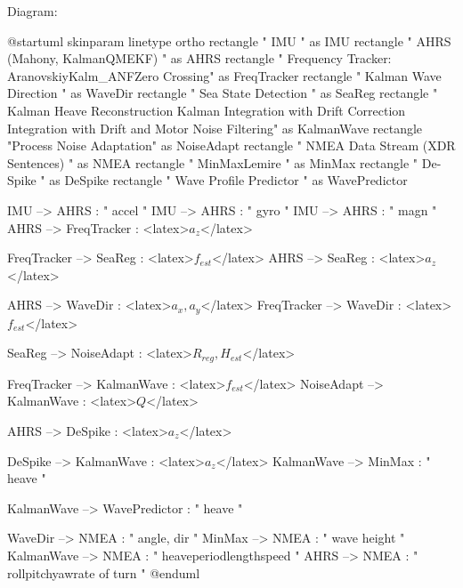 \documentclass{article}
\begin{document}
Diagram:

\begin{plantuml}
@startuml
skinparam linetype ortho
rectangle "                         IMU                          " as IMU
rectangle "                                                                AHRS (Mahony, KalmanQMEKF)                                                     " as AHRS
rectangle "    Frequency Tracker:     \n\n  Aranovskiy\n  Kalm_ANF\n  Zero Crossing" as FreqTracker
rectangle "    Kalman Wave Direction  " as WaveDir
rectangle "         Sea State Detection          " as SeaReg
rectangle "                             Kalman Heave Reconstruction                   \n\n         Kalman Integration with Drift Correction         \nKalman Integration with Drift and Motor Noise Filtering" as KalmanWave
rectangle "Process Noise Adaptation" as NoiseAdapt
rectangle "                         NMEA Data Stream (XDR Sentences)                      " as NMEA
rectangle "         MinMaxLemire      " as MinMax
rectangle "   De-Spike  " as DeSpike
rectangle " Wave Profile Predictor " as WavePredictor

IMU --> AHRS : " accel "
IMU --> AHRS : " gyro "
IMU --> AHRS : " magn "
AHRS --> FreqTracker : <latex>$a_{z}$</latex>

FreqTracker --> SeaReg : <latex>$f_{est}$</latex>
AHRS --> SeaReg : <latex>$a_{z}$</latex>

AHRS --> WaveDir : <latex>$a_{x}, a_{y}$</latex>
FreqTracker --> WaveDir : <latex>$f_{est}$</latex>

SeaReg --> NoiseAdapt : <latex>$R_{reg}, H_{est}$</latex>

FreqTracker --> KalmanWave : <latex>$f_{est}$</latex>
NoiseAdapt --> KalmanWave : <latex>$Q$</latex>

AHRS --> DeSpike : <latex>$a_{z}$</latex>

DeSpike --> KalmanWave : <latex>$a_{z}$</latex>
KalmanWave --> MinMax : " heave "

KalmanWave --> WavePredictor : " heave "

WaveDir --> NMEA : " angle, dir "
MinMax --> NMEA : " wave height "
KalmanWave --> NMEA : " heave\n period\n length\n speed "
AHRS --> NMEA : " roll\n pitch\n yaw\n rate of turn "
@enduml
\end{plantuml}
\end{document}
